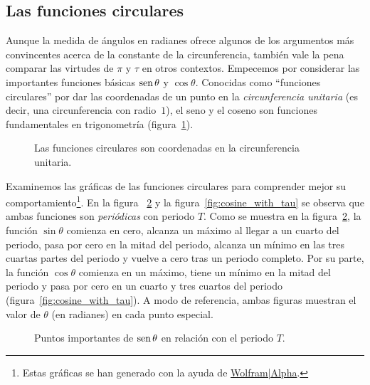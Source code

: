   \subsection{Las funciones circulares} %
  \label{sec:the_circle_functions}

Aunque la medida de ángulos en radianes ofrece algunos de los argumentos más convincentes acerca de la constante de la circunferencia, también vale la pena comparar las virtudes de $\pi$ y $\tau$ en otros contextos. Empecemos por considerar las importantes funciones básicas $\mbox{sen}\,\theta$ y $\cos\theta$. Conocidas como ``funciones circulares'' por dar las coordenadas de un punto en la \emph{circunferencia unitaria} (es decir, una circunferencia con radio~$1$), el seno y el coseno son funciones fundamentales en trigonometría (figura~\ref{fig:circle_functions}).

\begin{figure}
\begin{center}
\end{center}
\caption{Las funciones circulares son coordenadas en la circunferencia unitaria.\label{fig:circle_functions}}
\end{figure}

Examinemos las gráficas de las funciones circulares para comprender mejor su comportamiento\footnote{Estas gráficas se han generado con la ayuda de \href{http://www.wolframalpha.com/}{Wolfram|Alpha}.}. En la figura ~\ref{fig:sine_with_tau} y la figura~\ref{fig:cosine_with_tau} se observa que ambas funciones son \emph{periódicas} con periodo $T$. Como se muestra en la figura~\ref{fig:sine_with_tau}, la función $\sin\theta$ comienza en cero, alcanza un máximo al llegar a un cuarto del periodo, pasa por cero en la mitad del periodo, alcanza un mínimo en las tres cuartas partes del periodo y vuelve a cero tras un periodo completo. Por su parte, la función $\cos\theta$ comienza en un máximo, tiene un mínimo en la mitad del periodo y pasa por cero en un cuarto y tres cuartos del periodo (figura~\ref{fig:cosine_with_tau}). A modo de referencia, ambas figuras muestran el valor de $\theta$ (en radianes) en cada punto especial.

\begin{figure}
\begin{center}
\end{center}
\caption{Puntos importantes de $\mbox{sen}\,\theta$ en relación con el periodo $T$.\label{fig:sine_with_tau}}
\end{figure}

